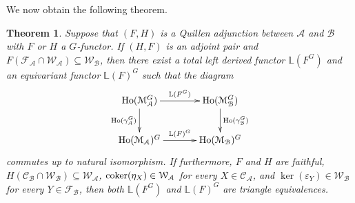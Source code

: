 \documentclass[12pt,twoside]{amsart}
\theoremstyle{bfupright head,slanted body}
\theoremstyle{bfupright head,upright body}
\theoremstyle{fixed bf head,slanted body}
\newtheorem{thm}[res]{Theorem}          \newtheorem*{thm*}{Theorem}
\theoremstyle{fixed bf head,upright body}
\theoremstyle{numbered paragraph}
\numberwithin{equation}{res}
\newcommand{\calC}{\mathcal{C}}
\newcommand{\calW}{\mathcal{W}}
\newcommand{\calF}{\mathcal{F}}
\newcommand{\calA}{\mathcal{A}}
\newcommand{\calB}{\mathcal{B}}
\newcommand{\calM}{\mathcal{M}}
\newcommand{\Ho}{\mathrm{Ho}}
\newcommand{\cok}{\mbox{\rm coker}}
\begin{document}
We now obtain the following theorem.
\begin{thm} \label{thmB origin}
Suppose that $(F, H)$ is a Quillen adjunction between $\calA$ and $\calB$ with
$F$ or $H$ a $G$-functor. If $(H,F)$ is an adjoint pair and $F(\calF_\calA \cap \calW_\calA) \subseteq \calW_\calB$, then there exist a total left derived functor $\mathbb{L}(F^G)$ and an equivariant functor $\mathbb{L}(F)^G$ such that the diagram
\[
\xymatrix@C=1.2CM{
   \Ho(\calM_\calA^G)
\ar[d]_-{\Ho(\gamma_{\calA}^G)}^-{ }
\ar[r]^-{\mathbb{L}(F^G)}
&  \Ho(\calM_\calB^G)
\ar[d]^-{\Ho(\gamma_\calB^G)}_-{ }             \\
   \Ho(\calM_\calA)^G
\ar[r]^-{\mathbb{L}(F)^G}
&  \Ho(\calM_\calB)^G                                            }
\]
commutes up to natural isomorphism.
If furthermore, \(F\) and \(H\) are faithful, \(H(\calC_\calB \cap \calW_\calB) \subseteq \calW_\calA\), \(\cok(\eta_X) \in \calW_\calA\) for every \(X \in \calC_\calA\), and \(\ker(\varepsilon_Y) \in \calW_\calB\) for every \(Y \in \calF_\calB\), then both \(\mathbb{L}(F^G)\) and \(\mathbb{L}(F)^G\) are triangle equivalences.
\end{thm}
\end{document}
